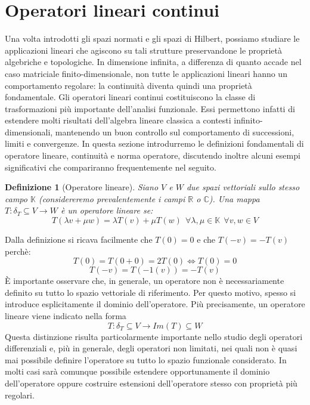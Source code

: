 \documentclass[a4paper,12pt]{report}
\newtheorem{definizione}{Definizione}[chapter]
\begin{document}
\newpage

\section{Operatori lineari continui}

Una volta introdotti gli spazi normati e gli spazi di Hilbert, possiamo studiare le applicazioni lineari che agiscono su tali strutture preservandone le proprietà algebriche e topologiche. In dimensione infinita, a differenza di quanto accade nel caso matriciale finito-dimensionale, non tutte le applicazioni lineari hanno un comportamento regolare: la continuità diventa quindi una proprietà fondamentale. Gli operatori lineari continui costituiscono la classe di trasformazioni più importante dell’analisi funzionale. Essi permettono infatti di estendere molti risultati dell’algebra lineare classica a contesti infinito-dimensionali, mantenendo un buon controllo sul comportamento di successioni, limiti e convergenze. In questa sezione introdurremo le definizioni fondamentali di operatore lineare, continuità e norma operatore, discutendo inoltre alcuni esempi significativi che compariranno frequentemente nel seguito.



\begin{definizione}[Operatore lineare]
    Siano $V$ e $W$ due spazi vettoriali sullo stesso campo $\mathbb{K}$ (considereremo prevalentemente i campi $\mathbb{R}$ o $\mathbb{C}$). Una mappa $T:\delta_T\subseteq V\to W$ è un operatore  lineare se: 
    \[T(\lambda v +\mu w)=\lambda T(v)+\mu T(w) \ \ \forall \lambda, \mu \in \mathbb{K}\ \  \forall v, w\in V\]
\end{definizione}
Dalla definizione si ricava facilmente che $T(0)=0$ e che $T(-v)=-T(v)$ perchè:
\[T(0)=T(0+0)=2T(0)\iff T(0)=0\]
\[T(-v)=T(-1(v))=-T(v)\]
È importante osservare che, in generale, un operatore non è necessariamente definito su tutto lo spazio vettoriale di riferimento. Per questo motivo, spesso si introduce esplicitamente il dominio dell’operatore. Più precisamente, un operatore lineare viene indicato nella forma
\[T:\delta_T\subseteq V\to Im(T)\subseteq W\]
Questa distinzione risulta particolarmente importante nello studio degli operatori differenziali e, più in generale, degli operatori non limitati, nei quali non è quasi mai possibile definire l’operatore su tutto lo spazio funzionale considerato.
In molti casi sarà comunque possibile estendere opportunamente il dominio dell’operatore oppure costruire estensioni dell’operatore stesso con proprietà più regolari.
\end{document}
